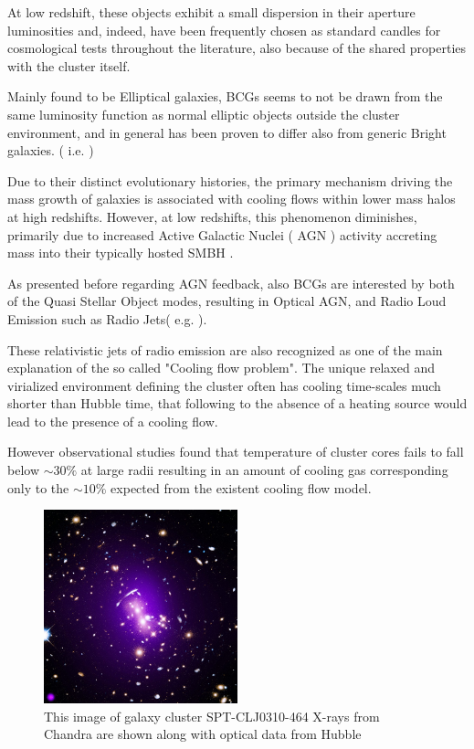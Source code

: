 At low redshift, these objects exhibit a small dispersion in their aperture luminosities and, indeed, have been frequently chosen as standard candles for cosmological tests throughout the literature, also because of the shared properties with the cluster itself.

Mainly found to be Elliptical galaxies, BCGs seems to not be drawn from the same luminosity function as normal elliptic objects outside the cluster environment, and in general has been proven to differ also from generic Bright galaxies.
 ( i.e. \cite{1977ApJ...212..311T}) 
  
Due to their distinct evolutionary histories, the primary mechanism driving the mass growth of galaxies is associated with cooling flows within lower mass halos at high redshifts. However, at low redshifts, this phenomenon diminishes, primarily due to increased Active Galactic Nuclei ( AGN ) activity accreting mass into their typically hosted SMBH \cite{2006ApJ...652..216R}.
 
As presented before regarding AGN feedback, also BCGs are interested by both of the Quasi Stellar Object modes, resulting in Optical AGN, and Radio Loud Emission such as Radio Jets( e.g. \cite{2007MNRAS.379..867V} ).

These relativistic jets of radio emission are also recognized as one of the main explanation of the so called "Cooling flow problem". The unique relaxed and virialized environment defining the cluster often has cooling time-scales much shorter than Hubble time, that following to the absence of a heating source would lead to the presence of a cooling flow.

However observational studies found that temperature of cluster cores fails to fall below $\sim 30\%$ at large radii resulting in an amount of cooling gas corresponding only to the $\sim 10\%$ expected from the existent cooling flow model. \cite{David_2001}

\begin{figure}[t]
  \centering
  \includegraphics[width=0.5\textwidth]{BCG}
  \caption{This image of galaxy cluster SPT-CLJ0310-464
  X-rays from Chandra are shown along with optical data from Hubble}
  \label{1}
\end{figure}

